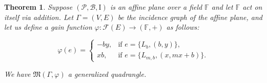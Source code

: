 \documentclass[11pt]{article}
\newtheorem{theorem}{Theorem}
\theoremstyle{definition}
\begin{document}
\begin{theorem}
Suppose $(\mathscr{P},\mathscr{B},\mathrm{I})$ is an affine plane over a field $\mathbb{F}$ and let $\mathbb{F}$ act on itself via addition.  Let $\Gamma = (V,E)$ be the incidence graph of the affine plane, and let us define a gain function $\varphi : \mathscr{F}(E) \rightarrow (\mathbb{F},+)$ as follows:

$$\varphi(e) = 
    \begin{cases}
        -by, & \text{if } e = \{ L_b, (b,y) \}, \\
        xb, & \text{if } e = \{ L_{m,b} , (x,mx+b) \}.
    \end{cases}$$

We have $\mathfrak{M}(\Gamma,\varphi)$ a generalized quadrangle.
\end{theorem}
\end{document}
